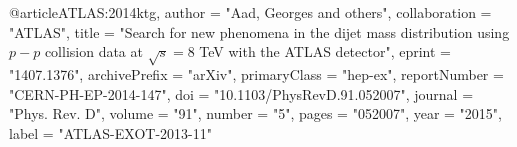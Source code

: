 @article{ATLAS:2014ktg,
    author = "Aad, Georges and others",
    collaboration = "ATLAS",
    title = "{Search for new phenomena in the dijet mass distribution using $p-p$ collision data at $\sqrt{s}=8$ TeV with the ATLAS detector}",
    eprint = "1407.1376",
    archivePrefix = "arXiv",
    primaryClass = "hep-ex",
    reportNumber = "CERN-PH-EP-2014-147",
    doi = "10.1103/PhysRevD.91.052007",
    journal = "Phys. Rev. D",
    volume = "91",
    number = "5",
    pages = "052007",
    year = "2015",
    label = "ATLAS-EXOT-2013-11"
}
